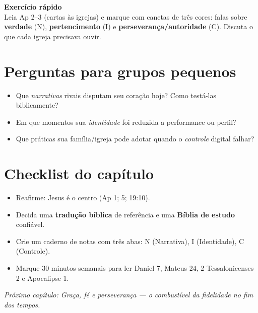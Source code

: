 \begin{nicbox}
\textbf{Exercício rápido}\\
Leia Ap 2--3 (cartas às igrejas) e marque com canetas de três cores: falas sobre \textbf{verdade} (N), \textbf{pertencimento} (I) e \textbf{perseverança/autoridade} (C). Discuta o que cada igreja precisava ouvir.
\end{nicbox}

\section{Perguntas para grupos pequenos}
\begin{itemize}[leftmargin=*,noitemsep]
  \item Que \textit{narrativas} rivais disputam seu coração hoje? Como testá-las biblicamente?
  \item Em que momentos sua \textit{identidade} foi reduzida a performance ou perfil?
  \item Que práticas sua família/igreja pode adotar quando o \textit{controle} digital falhar?
\end{itemize}

\section{Checklist do capítulo}
\begin{checklist}
\begin{itemize}[leftmargin=*,noitemsep]
  \item Reafirme: Jesus é o centro (Ap 1; 5; 19:10).
  \item Decida uma \textbf{tradução bíblica} de referência e uma \textbf{Bíblia de estudo} confiável.
  \item Crie um caderno de notas com três abas: N (Narrativa), I (Identidade), C (Controle).
  \item Marque 30 minutos semanais para ler Daniel 7, Mateus 24, 2 Tessalonicenses 2 e Apocalipse 1.
\end{itemize}
\end{checklist}

\bigskip
\noindent\textit{Próximo capítulo: Graça, fé e perseverança --- o combustível da fidelidade no fim dos tempos.}
